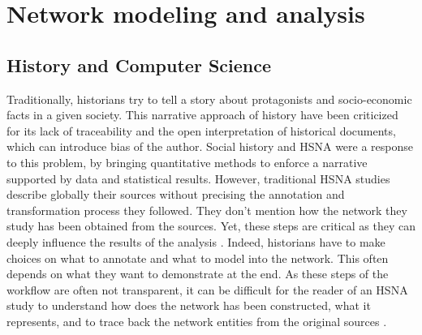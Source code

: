 \documentclass{vgtc}                          %
\begin{document}


\section{Network modeling and analysis}

\subsection{History and Computer Science}

Traditionally, historians try to tell a story about protagonists and socio-economic facts in a given society. This narrative approach of history have been criticized for its lack of traceability and the open interpretation of historical documents, which can introduce bias of the author.
Social history and HSNA were a response to this problem, by bringing quantitative methods to enforce a narrative supported by data and statistical results. However, traditional HSNA studies describe globally their sources without precising the annotation and transformation process they followed. They don't mention how the network they study has been obtained from the sources. Yet, these steps are critical as they can deeply influence the results of the analysis \cite{cristofoli_aux_2008}. Indeed, historians have to make choices on what to annotate and what to model into the network. This often depends on what they want to demonstrate at the end.
As these steps of the workflow are often not transparent, it can be difficult for the reader of an HSNA study to understand how does the network has been constructed, what it represents, and to trace back the network entities from the original sources \cite{dufournaud_recherche_2015}. 
\end{document}
